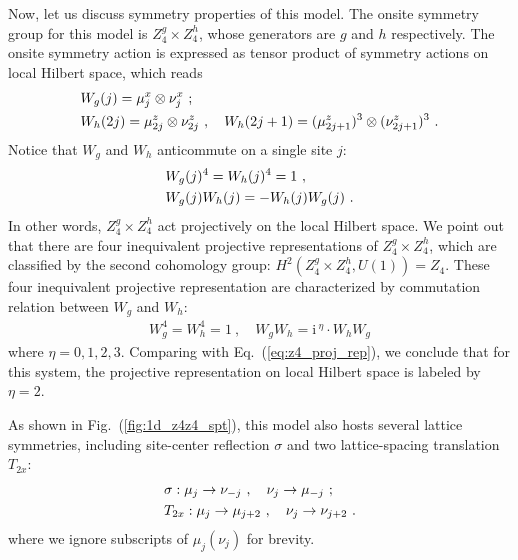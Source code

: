 \documentclass[reprint,amsmath,amssymb,aps,pra,]{revtex4-1}
\newcommand{\ii}{\mathrm{i}\,} %
\begin{document}
Now, let us discuss symmetry properties of this model.
The onsite symmetry group for this model is $Z_4^g\times Z_4^h$, whose generators are $g$ and $h$ respectively.
The onsite symmetry action is expressed as tensor product of symmetry actions on local Hilbert space, which reads
\begin{align}
  &W_g(j)=\mu^x_j\otimes \nu^x_j~;\notag\\
  &W_h(2j)=\mu^z_{2j}\otimes\nu^z_{2j}~,\quad W_h(2j+1)=(\mu^z_{2j+1})^3\otimes(\nu^z_{2j+1})^3~.
  \label{}
\end{align}
Notice that $W_g$ and $W_h$ anticommute on a single site $j$:
\begin{align}
  &W_g(j)^4=W_h(j)^4=1~,\notag\\
  &W_g(j)W_h(j)=-W_h(j)W_g(j)~.
  \label{eq:z4_proj_rep}
\end{align}
In other words, $Z_4^g\times Z_4^h$ act projectively on the local Hilbert space.
We point out that there are four inequivalent projective representations of $Z_4^g\times Z_4^h$, which are classified by the second cohomology group: $H^2(Z_4^g\times Z_4^h,U(1))=Z_4$.
These four inequivalent projective representation are characterized by commutation relation between $W_g$ and $W_h$:
\begin{align}
  W_g^4=W_h^4=1~,\quad W_gW_h=\ii^\eta\cdot W_hW_g
  \label{}
\end{align}
where $\eta=0,1,2,3$. 
Comparing with Eq.~(\ref{eq:z4_proj_rep}), we conclude that for this system, the projective representation on local Hilbert space is labeled by $\eta=2$.

As shown in Fig.~(\ref{fig:1d_z4z4_spt}), this model also hosts several lattice symmetries, including site-center reflection $\sigma$ and two lattice-spacing translation $T_{2x}$:
\begin{align}
  &\sigma:\mu_{j}\rightarrow\nu_{-j}~,\quad\nu_{j}\rightarrow\mu_{-j}~;\notag\\
  &T_{2x}:\mu_j\rightarrow\mu_{j+2}~,\quad\nu_j\rightarrow\nu_{j+2}~.
  \label{}
\end{align}
where we ignore subscripts of $\mu_j(\nu_j)$ for brevity.
\end{document}
